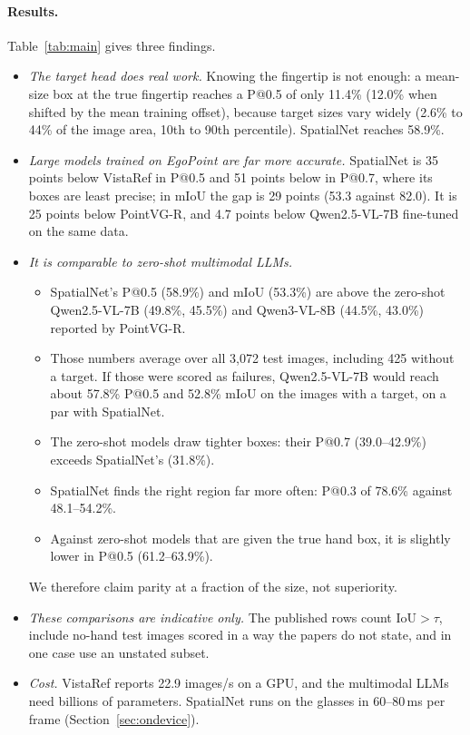 \paragraph{Results.} Table~\ref{tab:main} gives three findings.
\begin{itemize}
\item \emph{The target head does real work.} Knowing the fingertip is not enough: a mean-size box at the true fingertip reaches a P@0.5 of only 11.4\% (12.0\% when shifted by the mean training offset), because target sizes vary widely (2.6\% to 44\% of the image area, 10th to 90th percentile). SpatialNet reaches 58.9\%.
\item \emph{Large models trained on EgoPoint are far more accurate.} SpatialNet is 35 points below VistaRef in P@0.5 and 51 points below in P@0.7, where its boxes are least precise; in mIoU the gap is 29 points (53.3 against 82.0). It is 25 points below PointVG-R, and 4.7 points below Qwen2.5-VL-7B fine-tuned on the same data.
\item \emph{It is comparable to zero-shot multimodal LLMs.}
  \begin{itemize}
  \item SpatialNet's P@0.5 (58.9\%) and mIoU (53.3\%) are above the zero-shot Qwen2.5-VL-7B (49.8\%, 45.5\%) and Qwen3-VL-8B (44.5\%, 43.0\%) reported by PointVG-R.
  \item Those numbers average over all 3,072 test images, including 425 without a target. If those were scored as failures, Qwen2.5-VL-7B would reach about 57.8\% P@0.5 and 52.8\% mIoU on the images with a target, on a par with SpatialNet.
  \item The zero-shot models draw tighter boxes: their P@0.7 (39.0--42.9\%) exceeds SpatialNet's (31.8\%).
  \item SpatialNet finds the right region far more often: P@0.3 of 78.6\% against 48.1--54.2\%.
  \item Against zero-shot models that are given the true hand box, it is slightly lower in P@0.5 (61.2--63.9\%).
  \end{itemize}
  We therefore claim parity at a fraction of the size, not superiority.
\item \emph{These comparisons are indicative only.} The published rows count IoU${>}\tau$, include no-hand test images scored in a way the papers do not state, and in one case use an unstated subset.
\item \emph{Cost.} VistaRef reports 22.9 images/s on a GPU, and the multimodal LLMs need billions of parameters. SpatialNet runs on the glasses in 60--80\,ms per frame (Section~\ref{sec:ondevice}).
\end{itemize}

